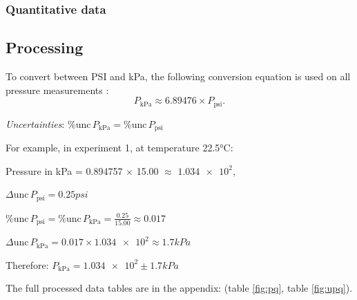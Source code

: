 \documentclass[a4paper,12pt]{article}
\newcommand{\absun}{\Delta \text{unc}\,}
\newcommand{\relun}{\% \text{unc}\,}
\begin{document}
\subsubsection*{Quantitative data}
\begin{figure}[H]
    \centering
\end{figure}

\subsection{Processing}
To convert between PSI and kPa, the following conversion equation is used on all pressure measurements \parencite{conver_units}:
\[
    P_{\text{kPa}} \approx 6.89476 \times P_{\text{psi}}.
\]

\textit{Uncertainties}: $\relun P_{\text{kPa}} = \relun P_{\text{psi}}$

\newpage
For example, in experiment 1, at temperature 22.5$\si{\celsius}$:

Pressure in kPa = 0.894757 $\times$ 15.00 $\approx$ $\num{1.034e+2}$,

$\absun P_{\text{psi}} = 0.25\si{psi}$

$\relun P_{\text{psi}} = \relun P_{\text{kPa}} =  \frac{0.25}{15.00} \approx 0.017$

$\absun P_{\text{kPa}} = 0.017 \times \num{1.034e+2} \approx \num{1.7} \si{kPa}$

Therefore: $P_{\text{kPa}} = \num{1.034e+2} \pm \num{1.7} \si{kPa}$

The full processed data tables are in the appendix: (table \ref{fig:pq}, table \ref{fig:upq}).
\end{document}
